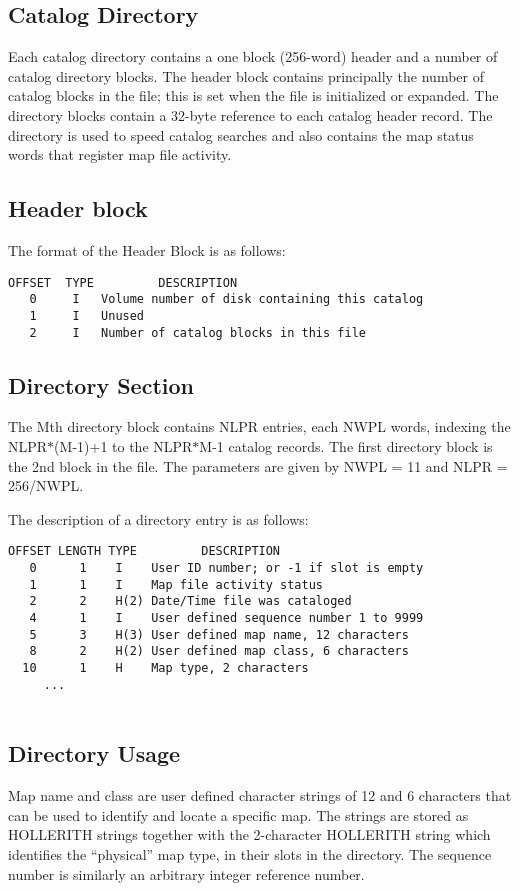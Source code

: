 \subsection{Catalog Directory}
Each catalog directory contains a one block (256-word) header and a
number of catalog directory blocks.  The header block contains
principally the number of catalog blocks in the file; this is set when
the file is initialized or expanded.  The directory blocks contain a
32-byte reference to each catalog header record.  The directory is
used to speed catalog searches and also contains the map status words
that register map file activity.


\subsection{Header block}
The format of the Header Block is as follows:


\begin{verbatim}
OFFSET  TYPE         DESCRIPTION
   0     I   Volume number of disk containing this catalog
   1     I   Unused
   2     I   Number of catalog blocks in this file

\end{verbatim}

\subsection{Directory Section}
The Mth directory block contains NLPR entries, each NWPL words,
indexing the NLPR$\ast$(M-1)+1 to the NLPR$\ast$M-1 catalog records. The first
directory block is the 2nd block in the file. The parameters are given
by NWPL = 11 and NLPR = 256/NWPL.

The description of a directory entry is as follows:

\begin{verbatim}
OFFSET LENGTH TYPE         DESCRIPTION
   0      1    I    User ID number; or -1 if slot is empty
   1      1    I    Map file activity status
   2      2    H(2) Date/Time file was cataloged
   4      1    I    User defined sequence number 1 to 9999
   5      3    H(3) User defined map name, 12 characters
   8      2    H(2) User defined map class, 6 characters
  10      1    H    Map type, 2 characters
     ...


\end{verbatim}

\subsection{Directory Usage}
Map name and class are user defined character strings of 12 and 6
characters that can be used to identify and locate a specific map.
The strings are stored as HOLLERITH strings together with the
2-character HOLLERITH string which identifies the ``physical'' map
type, in their slots in the directory.  The sequence number is
similarly an arbitrary integer reference number.

